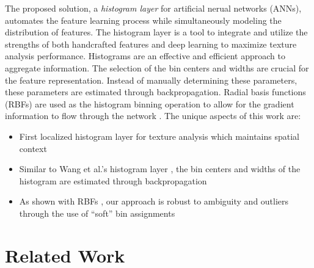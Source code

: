 \documentclass[journal]{IEEEtai}
\begin{document}
The proposed solution, a \textit{histogram layer} for artificial nerual networks (ANNs), automates the feature learning process while simultaneously modeling the distribution of features. The histogram layer is a tool to integrate and utilize the strengths of both handcrafted features and deep learning to maximize texture analysis performance. Histograms are an effective and efficient approach to aggregate information. The selection of the bin centers and widths are crucial for the feature representation. Instead of manually determining these parameters, these parameters are estimated through backpropagation. Radial basis functions (RBFs) are used as the histogram binning operation to allow for the gradient information to flow through the network \mbox{\cite{sedighi2017histogram}}.  The unique aspects of this work are:
\begin{itemize}
	\item First localized histogram layer for texture analysis which maintains spatial context
	\item Similar to Wang et al.'s histogram layer \mbox{\cite{wang2016learnable}}, the bin centers and widths of the histogram are estimated through backpropagation
	\item As shown with RBFs \mbox{\cite{sedighi2017histogram}}, our approach is robust to ambiguity and outliers through the use of ``soft'' bin assignments
\end{itemize}

\section{Related Work}
\end{document}
